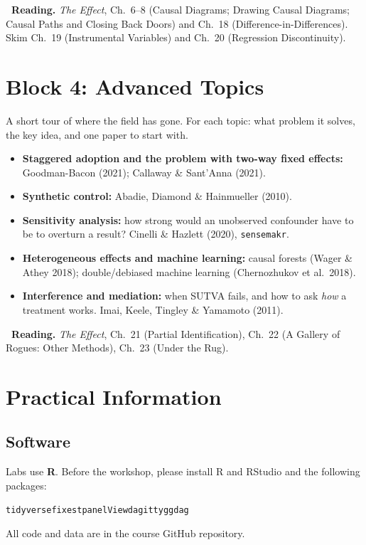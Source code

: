 \documentclass[11pt,a4paper]{article}
\newcommand{\blockmeta}[2]{\noindent{\color{midgrey}\faClock[regular]\ #1 \quad \faChalkboardTeacher\ #2}\par\smallskip}
\newcommand{\TheEffect}{\emph{The Effect}}
\begin{document}
\begin{reading}
\textbf{\faBookOpen\ Reading.}
\TheEffect, Ch.~6--8 (Causal Diagrams; Drawing Causal Diagrams; Causal Paths and Closing Back Doors) and Ch.~18 (Difference-in-Differences).
Skim Ch.~19 (Instrumental Variables) and Ch.~20 (Regression Discontinuity).
\end{reading}

\section{Block 4: Advanced Topics}
\blockmeta{25 minutes}{Lecture overview}

A short tour of where the field has gone. For each topic: what problem it solves, the key idea, and one paper to start with.

\begin{itemize}
  \item \textbf{Staggered adoption and the problem with two-way fixed effects:} Goodman-Bacon (2021); Callaway \& Sant'Anna (2021).
  \item \textbf{Synthetic control:} Abadie, Diamond \& Hainmueller (2010).
  \item \textbf{Sensitivity analysis:} how strong would an unobserved confounder have to be to overturn a result? Cinelli \& Hazlett (2020), \texttt{sensemakr}.
  \item \textbf{Heterogeneous effects and machine learning:} causal forests (Wager \& Athey 2018); double/debiased machine learning (Chernozhukov et al.\ 2018).
  \item \textbf{Interference and mediation:} when SUTVA fails, and how to ask \emph{how} a treatment works. Imai, Keele, Tingley \& Yamamoto (2011).
\end{itemize}

\begin{reading}
\textbf{\faBookOpen\ Reading.}
\TheEffect, Ch.~21 (Partial Identification), Ch.~22 (A Gallery of Rogues: Other Methods), Ch.~23 (Under the Rug).
\end{reading}

\section{Practical Information}

\subsection{Software}
Labs use \textbf{R}. Before the workshop, please install R and RStudio and the following packages:
\begin{center}
  \texttt{tidyverse}\quad \texttt{fixest}\quad \texttt{panelView}\quad \texttt{dagitty}\quad \texttt{ggdag}
\end{center}
All code and data are in the course GitHub repository.
\end{document}
